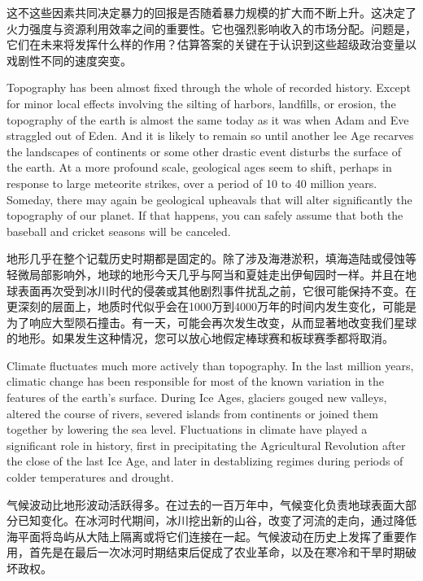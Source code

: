 \begin{Parallel}{97mm}{45mm}
  \ParallelRText
  {这不这些因素共同决定暴力的回报是否随着暴力规模的扩大而不断上升。这决定了火力强度与资源利用效率之间的重要性。它也强烈影响收入的市场分配。问题是，它们在未来将发挥什么样的作用？估算答案的关键在于认识到这些超级政治变量以戏剧性不同的速度突变。}
  \ParallelPar



  \ParallelLText
  {Topography has been almost fixed through the whole of recorded history. Except for minor local effects involving the silting of harbors, landfills, or erosion, the topography of the earth is almost the same today as it was when Adam and Eve straggled out of Eden. And it is likely to remain so until another lee Age recarves the landscapes of continents or some other drastic event disturbs the surface of the earth. At a more profound scale, geological ages seem to shift, perhaps in response to large meteorite strikes, over a period of 10 to 40 million years. Someday, there may again be geological upheavals that will alter significantly the topography of our planet. If that happens, you can safely assume that both the baseball and cricket seasons will be canceled.}
  
  \ParallelRText
  {地形几乎在整个记载历史时期都是固定的。除了涉及海港淤积，填海造陆或侵蚀等轻微局部影响外，地球的地形今天几乎与阿当和夏娃走出伊甸园时一样。并且在地球表面再次受到冰川时代的侵袭或其他剧烈事件扰乱之前，它很可能保持不变。在更深刻的层面上，地质时代似乎会在1000万到4000万年的时间内发生变化，可能是为了响应大型陨石撞击。有一天，可能会再次发生改变，从而显著地改变我们星球的地形。如果发生这种情况，您可以放心地假定棒球赛和板球赛季都将取消。}
  \ParallelPar


  \ParallelLText
  {Climate fluctuates much more actively than topography. In the last million years, climatic change has been responsible for most of the known variation in the features of the earth's surface. During Ice Ages, glaciers gouged new valleys, altered the course of rivers, severed islands from continents or joined them together by lowering the sea level. Fluctuations in climate have played a significant role in history, first in precipitating the Agricultural Revolution after the close of the last Ice Age, and later in destablizing regimes during periods of colder temperatures and drought.}
  
  \ParallelRText
  {气候波动比地形波动活跃得多。在过去的一百万年中，气候变化负责地球表面大部分已知变化。在冰河时代期间，冰川挖出新的山谷，改变了河流的走向，通过降低海平面将岛屿从大陆上隔离或将它们连接在一起。气候波动在历史上发挥了重要作用，首先是在最后一次冰河时期结束后促成了农业革命，以及在寒冷和干旱时期破坏政权。}
  \ParallelPar



\end{Parallel}
